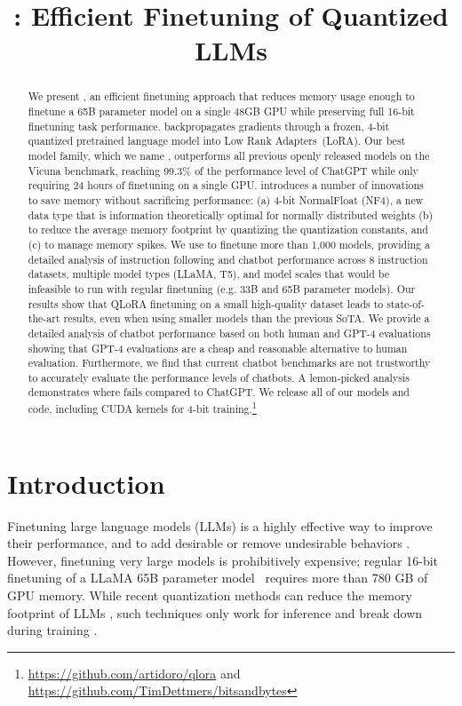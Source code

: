 \title{: Efficient Finetuning of Quantized LLMs}

\begin{abstract}
We present \method, an efficient finetuning approach that reduces memory usage enough to finetune a 65B parameter model on a single 48GB GPU while preserving full 16-bit finetuning task performance. \method backpropagates gradients through a frozen, 4-bit quantized pretrained language model into Low Rank Adapters~(LoRA). Our best model family, which we name \bfmodel, outperforms all previous openly released models on the Vicuna benchmark, reaching 99.3\% of the performance level of ChatGPT while only requiring 24 hours of finetuning on a single GPU. \method introduces a number of innovations to save memory without sacrificing performance: (a) 4-bit NormalFloat (NF4), a new data type that is information theoretically optimal for normally distributed weights (b) \Doublequant to reduce the average memory footprint by quantizing the quantization constants, and (c) \Pagedoptim to manage memory spikes. We use \method to finetune more than 1,000 models, providing a detailed analysis of instruction following and chatbot performance across 8 instruction datasets, multiple model types (LLaMA, T5), and model scales that would be infeasible to run with regular finetuning (e.g. 33B and 65B parameter models). Our results show that QLoRA finetuning on a small high-quality dataset leads to state-of-the-art results, even when using smaller models than the previous SoTA. We provide a detailed analysis of chatbot performance based on both human and GPT-4 evaluations showing that GPT-4 evaluations are a cheap and reasonable alternative to human evaluation. Furthermore, we find that current chatbot benchmarks are not trustworthy to accurately evaluate the performance levels of chatbots. A lemon-picked analysis demonstrates where \bfmodel fails compared to ChatGPT. We release all of our models and code, including CUDA kernels for 4-bit training.\footnote{\url{https://github.com/artidoro/qlora} and \url{https://github.com/TimDettmers/bitsandbytes}}
\end{abstract}

\section{Introduction}

Finetuning large language models (LLMs) is a highly effective way to improve their performance, \citep{min2021metaicl, wei2021finetuned, ouyang2022training, wang2022super, wang2022self, liu2022few} and to add desirable or remove undesirable behaviors \citep{ouyang2022training,askell2021general,bai2022training}.
However, finetuning very large models is prohibitively expensive; regular 16-bit finetuning of a LLaMA 65B parameter model~\citep{touvron2023llama} requires more than 780 GB of GPU memory. While recent quantization methods can reduce the memory footprint of LLMs \citep{dettmers2022llm, dettmers2022case, frantar2022gptq, xiao2022smoothquant}, such techniques only work for inference and break down during training \citep{wortsman2023stable}. 


